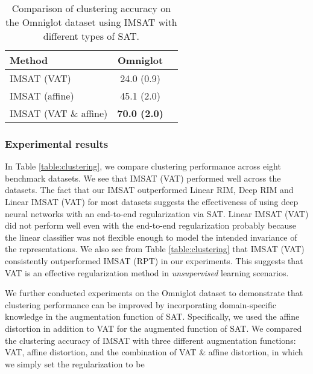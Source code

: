\documentclass{article}
\theoremstyle{plain}
\begin{document}
\begin{table}[t] 
\caption{Comparison of clustering accuracy on the Omniglot dataset using IMSAT with different types of SAT.}
\begin{center}
\begin{tabular}{|l||c|c|}\hline
Method & Omniglot \\ \hline \hline
IMSAT (VAT)  &  24.0 (0.9)   \\ \hline
IMSAT (affine) & 45.1 (2.0) \\ \hline
IMSAT (VAT \& affine) & {\bf 70.0 (2.0)}  \\ \hline
\end{tabular}
\vspace*{-\baselineskip}
\label{table:clustering_omniglot}
\end{center}
\end{table}



\subsubsection{Experimental results } \label{sec:exp_clustering}

In Table \ref{table:clustering}, we compare clustering performance across eight benchmark datasets. 
We see that IMSAT (VAT) performed well across the datasets. 
The fact that our IMSAT outperformed Linear RIM, Deep RIM and Linear IMSAT (VAT) for most datasets suggests the effectiveness of using deep neural networks with an end-to-end regularization via SAT. 
Linear IMSAT (VAT) did not perform well even with the end-to-end regularization probably because the linear classifier was not flexible enough to model the intended invariance of the representations.
We also see from Table \ref{table:clustering} that IMSAT (VAT) consistently outperformed IMSAT (RPT) in our experiments.  
This suggests that VAT is an effective regularization method in \emph{unsupervised} learning scenarios.

We further conducted experiments on the Omniglot dataset to demonstrate that clustering performance can be improved by incorporating domain-specific knowledge in the augmentation function of SAT. Specifically, we used the affine distortion in addition to VAT for the augmented function of SAT. We compared the clustering accuracy of IMSAT with three different augmentation functions: VAT, affine distortion, and the combination of VAT \& affine distortion, in which we simply set the regularization to be
\end{document}
